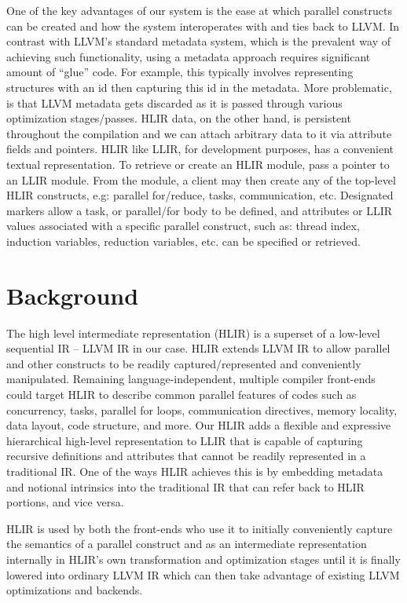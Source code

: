 \documentclass[12pt]{article}
\begin{document}
One of the key advantages of our system is the ease at which parallel constructs can be created and how the system interoperates with and ties back to LLVM. In contrast with LLVM's standard metadata system, which is the prevalent way of achieving such functionality, using a metadata approach requires significant amount of ``glue'' code. For example, this typically involves representing structures with an id then capturing this id in the metadata. More problematic, is that LLVM metadata gets discarded as it is passed through various optimization stages/passes. HLIR data, on the other hand, is persistent throughout the compilation and we can attach arbitrary data to it via attribute fields and pointers. HLIR like LLIR, for development purposes, has a convenient textual representation. To retrieve or create an HLIR module, pass a pointer to an LLIR module. From the module, a client may then create any of the top-level HLIR constructs, e.g: parallel for/reduce, tasks, communication, etc. Designated markers allow a task, or parallel/for body to be defined, and attributes or LLIR values associated with a specific parallel construct, such as: thread index, induction variables, reduction variables, etc. can be specified or retrieved.

\section{Background}

The high level intermediate representation (HLIR) is a superset of a low-level sequential IR -- LLVM IR in our case. HLIR extends LLVM IR to allow parallel and other constructs to be readily captured/represented and conveniently manipulated. Remaining language-independent, multiple compiler front-ends could target HLIR to describe common parallel features of codes such as concurrency, tasks, parallel for loops, communication directives, memory locality, data layout, code structure, and more. Our HLIR adds a flexible and expressive hierarchical high-level representation to LLIR that is capable of capturing recursive definitions and attributes that cannot be readily represented in a traditional IR. One of the ways HLIR achieves this is by embedding metadata and notional intrinsics into the traditional IR that can refer back to HLIR portions, and vice versa.

HLIR is used by both the front-ends who use it to initially conveniently capture the semantics of a parallel construct and as an intermediate representation internally in HLIR's own transformation and optimization stages until it is finally lowered into ordinary LLVM IR which can then take advantage of existing LLVM optimizations and backends.
\end{document}
